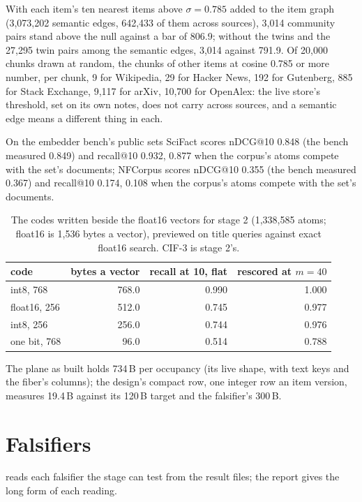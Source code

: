 \documentclass[11pt]{article}
\theoremstyle{plain}
\theoremstyle{definition}
\theoremstyle{remark}
\begin{document}
With each item's ten nearest items above $\sigma = 0.785$ added to the item graph (3,073,202 semantic edges, 642,433 of them across sources), 3,014 community pairs stand above the null against a bar of 806.9; without the twins and the 27,295 twin pairs among the semantic edges, 3,014 against 791.9. Of 20,000 chunks drawn at random, the chunks of other items at cosine 0.785 or more number, per chunk, 9 for Wikipedia, 29 for Hacker News, 192 for Gutenberg, 885 for Stack Exchange, 9,117 for arXiv, 10,700 for OpenAlex: the live store's threshold, set on its own notes, does not carry across sources, and a semantic edge means a different thing in each.

On the embedder bench's public sets SciFact scores nDCG@10 0.848 (the bench measured 0.849) and recall@10 0.932, 0.877 when the corpus's atoms compete with the set's documents; NFCorpus scores nDCG@10 0.355 (the bench measured 0.367) and recall@10 0.174, 0.108 when the corpus's atoms compete with the set's documents.

\begin{table}[ht]
\centering\small
\begin{tabular}{lrrr}
\toprule
code & bytes a vector & recall at 10, flat & rescored at $m = 40$\\
\midrule
int8, 768 & 768.0 & 0.990 & 1.000\\
float16, 256 & 512.0 & 0.745 & 0.977\\
int8, 256 & 256.0 & 0.744 & 0.976\\
one bit, 768 & 96.0 & 0.514 & 0.788\\
\bottomrule
\end{tabular}
\caption{The codes written beside the float16 vectors for stage 2 (1,338,585 atoms; float16 is 1,536 bytes a vector), previewed on title queries against exact float16 search. CIF-3 is stage 2's.}
\label{tab:codes}
\end{table}

The plane as built holds 734\,B per occupancy (its live shape, with text keys and the fiber's columns); the design's compact row, one integer row an item version, measures 19.4\,B against its 120\,B target and the falsifier's 300\,B.

\section{Falsifiers}
 reads each falsifier the stage can test from the result files; the report gives the long form of each reading.
\end{document}
